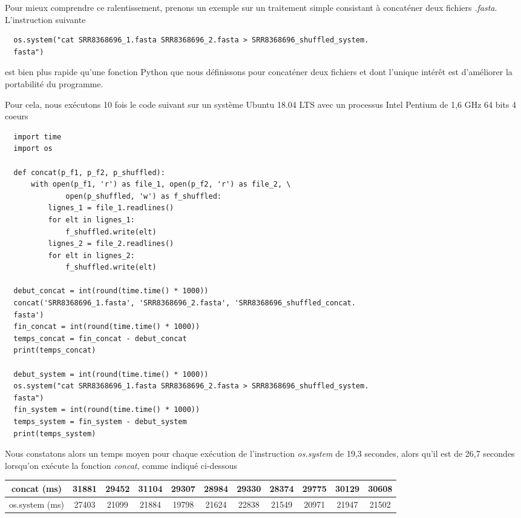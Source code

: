 \documentclass[twoside,a4paper,11pt,frenchb,openany]{report}
\begin{document}
Pour mieux comprendre ce ralentissement, prenons un exemple sur un traitement simple consistant à concaténer deux fichiers \textit{.fasta}. L'instruction suivante

\begin{verbatim}  os.system("cat SRR8368696_1.fasta SRR8368696_2.fasta > SRR8368696_shuffled_system.
  fasta")\end{verbatim}

est bien plus rapide qu'une fonction Python que nous définissons pour concaténer deux fichiers et dont l'unique intérêt est d'améliorer la portabilité du programme. 

Pour cela, nous exécutons 10 fois le code suivant sur un système Ubuntu 18.04 LTS avec un processus Intel Pentium de 1,6 GHz 64 bits 4 coeurs

\begin{verbatim}
  import time
  import os

  def concat(p_f1, p_f2, p_shuffled):
      with open(p_f1, 'r') as file_1, open(p_f2, 'r') as file_2, \
              open(p_shuffled, 'w') as f_shuffled:
          lignes_1 = file_1.readlines()
          for elt in lignes_1:
              f_shuffled.write(elt)
          lignes_2 = file_2.readlines()
          for elt in lignes_2:
              f_shuffled.write(elt)

  debut_concat = int(round(time.time() * 1000))
  concat('SRR8368696_1.fasta', 'SRR8368696_2.fasta', 'SRR8368696_shuffled_concat.
  fasta')
  fin_concat = int(round(time.time() * 1000))
  temps_concat = fin_concat - debut_concat
  print(temps_concat)

  debut_system = int(round(time.time() * 1000))
  os.system("cat SRR8368696_1.fasta SRR8368696_2.fasta > SRR8368696_shuffled_system.
  fasta")
  fin_system = int(round(time.time() * 1000))
  temps_system = fin_system - debut_system
  print(temps_system)
\end{verbatim}

Nous constatons alors un temps moyen pour chaque exécution de l'instruction \textit{os.system} de 19,3 secondes, alors qu'il est de 26,7 secondes lorsqu'on exécute la fonction \textit{concat}, comme indiqué ci-dessous

\begin{tabular}{|c|c|c|c|c|c|c|c|c|c|c|}
\hline
concat (ms) & 31881 & 29452 & 31104 & 29307 & 28984 & 29330 & 28374 & 29775 & 30129 & 30608 \\
\hline
os.system (ms) & 27403 & 21099 & 21884 & 19798 & 21624 & 22838 & 21549 & 20971 & 21947 & 21502\\
\hline
\end{tabular}
\end{document}
